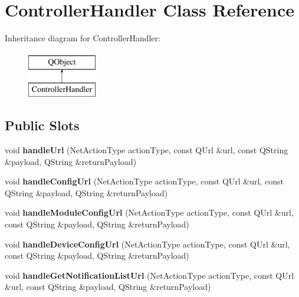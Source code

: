 \hypertarget{class_controller_handler}{}\section{Controller\+Handler Class Reference}
\label{class_controller_handler}
Inheritance diagram for Controller\+Handler\+:\begin{figure}[H]
\begin{center}
\leavevmode
\includegraphics[height=2.000000cm]{class_controller_handler}
\end{center}
\end{figure}
\subsection*{Public Slots}
\begin{DoxyCompactItemize}
\item 
\mbox{\label{class_controller_handler_a0270003185af723b180b542766efe86f}} 
void {\bfseries handle\+Url} (Net\+Action\+Type action\+Type, const Q\+Url \&url, const Q\+String \&payload, Q\+String \&return\+Payload)
\item 
\mbox{\label{class_controller_handler_a4227eb7b7f4d8f1b592da4dd7132f1fd}} 
void {\bfseries handle\+Config\+Url} (Net\+Action\+Type action\+Type, const Q\+Url \&url, const Q\+String \&payload, Q\+String \&return\+Payload)
\item 
\mbox{\label{class_controller_handler_a64db76b22537c3007f086d751778d073}} 
void {\bfseries handle\+Module\+Config\+Url} (Net\+Action\+Type action\+Type, const Q\+Url \&url, const Q\+String \&payload, Q\+String \&return\+Payload)
\item 
\mbox{\label{class_controller_handler_a62b09014561aeb0c87090a19355ed83e}} 
void {\bfseries handle\+Device\+Config\+Url} (Net\+Action\+Type action\+Type, const Q\+Url \&url, const Q\+String \&payload, Q\+String \&return\+Payload)
\item 
\mbox{\label{class_controller_handler_a7879364e3cf8e22f4fc92f0b08056309}} 
void {\bfseries handle\+Get\+Notification\+List\+Url} (Net\+Action\+Type action\+Type, const Q\+Url \&url, const Q\+String \&payload, Q\+String \&return\+Payload)
\end{DoxyCompactItemize}

